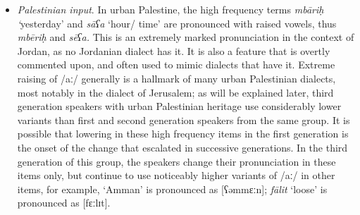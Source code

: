 \documentclass[output=paper]{langsci/langscibook}
\begin{document}
\begin{itemize}
\item \textit{Palestinian input}. In urban Palestine, the high frequency terms \textit{mbāriḥ} \textit{‘}yesterday’ and \textit{sāʕa} ‘hour/ time’ are pronounced with raised vowels, thus \textit{mbēriḥ} and \textit{sēʕa.} This is an extremely marked pronunciation in the context of Jordan, as no Jordanian dialect has it. It is also a feature that is overtly commented upon, and often used to mimic dialects that have it. Extreme raising of /aː/ generally is a hallmark of many urban Palestinian dialects, most notably in the dialect of Jerusalem; as will be explained later, third generation speakers with urban Palestinian heritage use considerably lower variants than first and second generation speakers from the same group. It is possible that lowering in these high frequency items in the first generation is the onset of the change that escalated in successive generations. In the third generation of this group, the speakers change their pronunciation in these items only, but continue to use noticeably higher variants of /aː/ in other items, for example, ‘Amman’ is pronounced as [ʕəmmɛːn]; \textit{fālit} ‘loose’ is pronounced as [fɛːlɪt].
\end{itemize}
\end{document}
